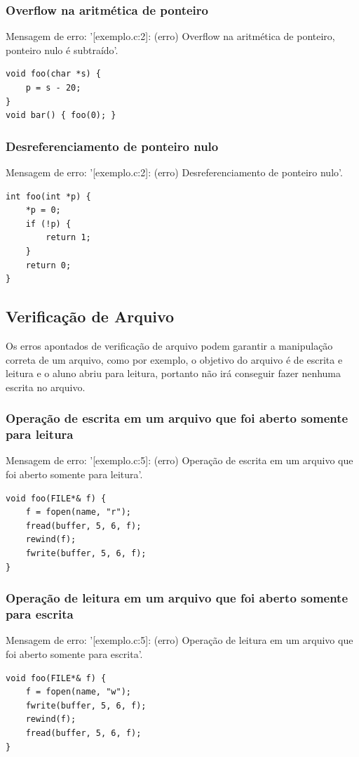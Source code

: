 \documentclass[12pt,a4paper]{report}
\begin{document}
\subsubsection{Overflow na aritmética de ponteiro}
Mensagem de erro: '[exemplo.c:2]: (erro) Overflow na aritmética de ponteiro, ponteiro nulo é subtraído'.
\begin{lstlisting}[style=CStyle]
void foo(char *s) {
    p = s - 20;
}
void bar() { foo(0); }
\end{lstlisting}

\subsubsection{Desreferenciamento de ponteiro nulo}
Mensagem de erro: '[exemplo.c:2]: (erro) Desreferenciamento de ponteiro nulo'.

\begin{lstlisting}[style=CStyle]
int foo(int *p) {
    *p = 0;
    if (!p) {
        return 1;
    }
    return 0;
}
\end{lstlisting}


\subsection{Verificação de Arquivo}

Os erros apontados de verificação de arquivo podem garantir a manipulação correta de um arquivo, como por exemplo, o objetivo do arquivo é de escrita e leitura e o aluno abriu para leitura, portanto não irá conseguir fazer nenhuma escrita no arquivo.

\subsubsection{Operação de escrita em um arquivo que foi aberto somente para leitura}
Mensagem de erro: '[exemplo.c:5]: (erro) Operação de escrita em um arquivo que foi aberto somente para leitura'.
\begin{lstlisting}[style=CStyle]
void foo(FILE*& f) {
    f = fopen(name, "r");
    fread(buffer, 5, 6, f);
    rewind(f);
    fwrite(buffer, 5, 6, f);
}
\end{lstlisting}

\subsubsection{Operação de leitura em um arquivo que foi aberto somente para escrita}
Mensagem de erro: '[exemplo.c:5]: (erro) Operação de leitura em um arquivo que foi aberto somente para escrita'.
\begin{lstlisting}[style=CStyle]
void foo(FILE*& f) {
    f = fopen(name, "w");
    fwrite(buffer, 5, 6, f);
    rewind(f);
    fread(buffer, 5, 6, f);
}
\end{lstlisting}
\end{document}
